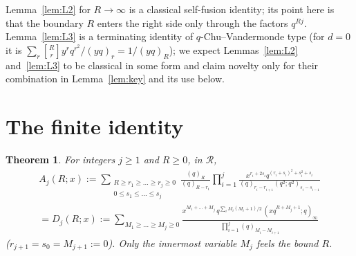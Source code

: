 \documentclass[11pt]{amsart}
\newtheorem{theorem}{Theorem}[section]
\theoremstyle{definition}
\numberwithin{equation}{section}
\newcommand{\R}{\mathcal{R}}
\newcommand{\qbin}[2]{\genfrac{[}{]}{0pt}{}{#1}{#2}}
\begin{document}
Lemma~\ref{lem:L2} for $R\to\infty$ is a classical self-fusion identity; its point here is that the
boundary $R$ enters the right side only through the factors $q^{Rj}$. Lemma~\ref{lem:L3} is a
terminating identity of $q$-Chu--Vandermonde type (for $d=0$ it is
$\sum_r\qbin Rry^rq^{r^2}/(yq)_r=1/(yq)_R$); we expect Lemmas~\ref{lem:L2} and~\ref{lem:L3} to be classical
in some form and claim novelty only for their combination in Lemma~\ref{lem:key} and its use below.

\section{The finite identity}\label{sec:R}

\begin{theorem}\label{thm:R}
For integers $j\ge1$ and $R\ge0$, in $\R$,
\begin{multline*}
A_j(R;x):=\sum_{\substack{R\ge r_1\ge\dots\ge r_j\ge0\\0\le s_1\le\dots\le s_j}}\frac{(q)_R}{(q)_{R-r_1}}
\prod_{i=1}^{j}\frac{x^{r_i+2s_i}q^{(r_i+s_i)^2+s_i^2+s_i}}{(q)_{r_i-r_{i+1}}(q^2;q^2)_{s_i-s_{i-1}}}\\
=D_j(R;x):=\sum_{M_1\ge\dots\ge M_j\ge0}\frac{x^{M_1+\dots+M_j}\,q^{\sum_iM_i(M_i+1)/2}\,(xq^{R+M_j+1};q)_\infty}{\prod_{i=1}^{j}(q)_{M_i-M_{i+1}}}
\end{multline*}
($r_{j+1}=s_0=M_{j+1}:=0$). Only the innermost variable $M_j$ feels the bound $R$.
\end{theorem}
\end{document}
